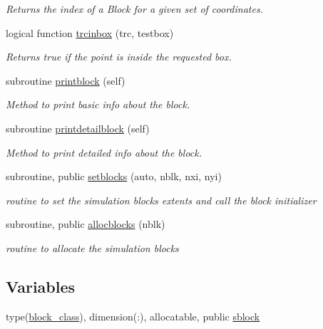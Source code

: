 \begin{DoxyCompactItemize}
\begin{DoxyCompactList}\small\item\em Returns the index of a Block for a given set of coordinates. \end{DoxyCompactList}\item 
logical function \mbox{\hyperlink{namespaceblocks__mod_ad8d92210b3d4ade090d2a19b97f4c88e}{trcinbox}} (trc, testbox)
\begin{DoxyCompactList}\small\item\em Returns true if the point is inside the requested box. \end{DoxyCompactList}\item 
subroutine \mbox{\hyperlink{namespaceblocks__mod_a6eab8b323cb15dcecb5c6b0c31b4e246}{printblock}} (self)
\begin{DoxyCompactList}\small\item\em Method to print basic info about the block. \end{DoxyCompactList}\item 
subroutine \mbox{\hyperlink{namespaceblocks__mod_a10f356706988c45a255922fe70851488}{printdetailblock}} (self)
\begin{DoxyCompactList}\small\item\em Method to print detailed info about the block. \end{DoxyCompactList}\item 
subroutine, public \mbox{\hyperlink{namespaceblocks__mod_a8f5a5d9e6cfd16cfd1b179092a204696}{setblocks}} (auto, nblk, nxi, nyi)
\begin{DoxyCompactList}\small\item\em routine to set the simulation blocks extents and call the block initializer \end{DoxyCompactList}\item 
subroutine, public \mbox{\hyperlink{namespaceblocks__mod_a639beb0fee2290d46353f4b4702d6711}{allocblocks}} (nblk)
\begin{DoxyCompactList}\small\item\em routine to allocate the simulation blocks \end{DoxyCompactList}\end{DoxyCompactItemize}
\subsection*{Variables}
\begin{DoxyCompactItemize}
\item 
type(\mbox{\hyperlink{structblocks__mod_1_1block__class}{block\+\_\+class}}), dimension(\+:), allocatable, public \mbox{\hyperlink{namespaceblocks__mod_a13b3fc755dfbf3e333490a3f931b28aa}{sblock}}
\end{DoxyCompactItemize}


